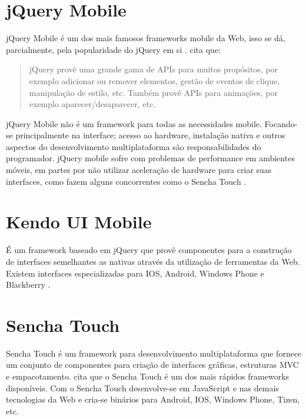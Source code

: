 \section{jQuery Mobile}
\label{jmobile}

jQuery Mobile é um dos mais famosos frameworks mobile da Web,
isso se dá, parcialmente, pela popularidade do jQuery em si
\textsc{\autocite[p. 14]{viabilityBusinessApplications}}. \citet[p.
2]{crossPlatformAppsAnimations} cita que:
\begin{quote}
jQuery provê uma grande gama de APIs para muitos propósitos, por
exemplo adicionar ou remover elementos, gestão de eventos de clique,
manipulação de estilo, etc. Também provê APIs para animações, por
exemplo aparecer/desaparecer, etc.
\end{quote}

jQuery Mobile não é um framework para todas as necessidades mobile.
Focando-se principalmente na interface; acesso ao hardware, instalação
nativa e outros aspectos do desenvolvimento multiplataforma
são responsabilidades do programador. jQuery mobile sofre com
problemas de performance em ambientes móveis, em partes por não
utilizar aceleração de hardware para criar suas interfaces,
como fazem alguns concorrentes como o Sencha Touch \autocite[p.
14]{viabilityBusinessApplications}.

\section{Kendo UI Mobile}
\label{kendo}

É um framework baseado em jQuery que provê componentes para a
construção de interfaces semelhantes as nativas através da
utilização de ferramentas da Web. Existem interfaces especializadas
para IOS, Android, Windows Phone e Blackberry \textsc{\autocite{kendoui}}.

\section{Sencha Touch}

Sencha Touch é um framework para desenvolvimento multiplataforma
que fornece um conjunto de componentes para criação de
interfaces gráficas, estruturas MVC e empacotamento. \citet[p.
14]{viabilityBusinessApplications} cita que o Sencha Touch é um dos
mais rápidos frameworks disponíveis. Com o Sencha Touch desenvolve-se
em JavaScript e nas demais tecnologias da Web e cria-se binários para
Android, IOS, Windows Phone, Tizen, etc.

